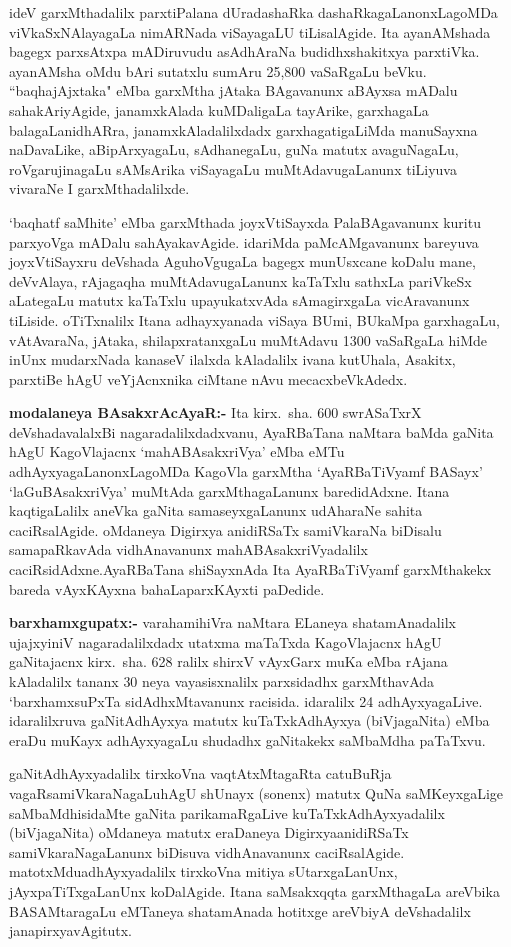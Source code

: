 ideV garxMthadalilx parxtiPalana dUradashaRka dashaRkagaLanonxLagoMDa viVkaSxNAlaya\-gaLa nimARNada viSayagaLU tiLisalAgide. Ita ayanAMshada bagegx parxsAtxpa mADiru\-vudu asAdhAraNa budidhxshakitxya parxtiVka. ayanAMsha oMdu bAri sutatxlu sumAru {\rm 25,800} vaSaRgaLu beVku. ``baqhajAjxtaka" eMba garxMtha jAtaka BAgavanunx aBAyxsa mADalu sahakAriyAgide, janamxkAlada kuMDaligaLa tayArike, garxhagaLa balagaLa\break nidhARra, janamxkAladalilxdadx garxhagatigaLiMda manuSayxna naDavaLike, aBipArxyagaLu, sAdhane\-gaLu, guNa matutx avaguNagaLu, roVgarujinagaLu sAMsArika viSayagaLu muMtAda\-vugaLanunx tiLiyuva vivaraNe I garxMthadalilxde.

`baqhatf saMhite' eMba garxMthada joyxVtiSayxda PalaBAgavanunx kuritu parxyoVga mADalu sahAyakavAgide. idariMda paMcAMgavanunx bareyuva joyxVtiSayxru deVshada AguhoVgugaLa bagegx munUsxcane koDalu mane, deVvAlaya, rAjagaqha muMtAdavugaLanunx kaTaTxlu sathxLa pariVkeSx aLategaLu matutx kaTaTxlu upayukatxvAda sAmagirxgaLa vicAravanunx tiLiside. oTiTxnalilx Itana adhayxyanada viSaya BUmi, BUkaMpa garxhagaLu, vAtAvaraNa, jAtaka, shilapxratanxgaLu muMtAdavu {\rm 1300} vaSaRgaLa hiMde inUnx mudarxNada kanaseV ilalxda kAladalilx ivana kutUhala, Asakitx, parxtiBe hAgU veYjAcnxnika ciMtane nAvu mecacxbeVkAdedx.

\textbf{modalaneya BAsakxrAcAyaR:-} Ita kirx.~sha. {\rm 600} swrASaTxrX deVshadavalalxBi nagara\-dalilxdadxvanu, AyaRBaTana naMtara baMda gaNita hAgU  KagoVlajacnx `mahABAsakxriVya' eMba eMTu adhAyxyagaLanonxLagoMDa KagoVla garxMtha `AyaRBaTiVyamf BASayx' `laGuBAsakxriVya' muMtAda garxMthagaLanunx baredidAdxne. Itana kaqtigaLalilx aneVka gaNita samaseyxgaLanunx udAharaNe sahita caciRsalAgide. oMdaneya Digirxya anidiRSaTx samiV\-karaNa biDisalu samapaRkavAda vidhAnavanunx mahABAsakxriVyadalilx caciRsidAdxne.\break AyaRBaTana shiSayxnAda Ita AyaRBaTiVyamf garxMthakekx bareda vAyxKAyxna bahaLa\break parxKAyxti paDedide. 

\textbf{barxhamxgupatx:-} varahamihiVra naMtara ELaneya shatamAnadalilx ujajxyiniV nagaradalilxdadx utatxma maTaTxda KagoVlajacnx hAgU gaNitajacnx kirx.~sha. {\rm 628} ralilx shirxV vAyxGarx muKa eMba rAjana kAladalilx tananx {\rm 30} neya vayasisxnalilx parxsidadhx garxMthavAda `barxhamxsuPxTa sidAdhxMtavanunx racisida. idaralilx {\rm 24} adhAyxyagaLive. idaralilxruva gaNitAdhAyxya matutx kuTaTxkAdhAyxya (biVjagaNita) eMba eraDu muKayx adhAyxyagaLu shudadhx gaNitakekx saMbaMdha paTaTxvu.

gaNitAdhAyxyadalilx tirxkoVna vaqtAtxMtagaRta catuBuRja vagaRsamiVkaraNagaLu\break hAgU shUnayx (sonenx) matutx QuNa saMKeyxgaLige saMbaMdhisidaMte gaNita parikamaRgaLive kuTaTxkAdhAyxyadalilx (biVjagaNita) oMdaneya matutx eraDaneya Digirxya\break anidiRSaTx samiVkaraNagaLanunx biDisuva vidhAnavanunx caciRsalAgide. matotxMdu\break adhAyxyadalilx tirxkoVna mitiya sUtarxgaLanUnx, jAyxpaTiTxgaLanUnx koDalAgide. Itana saMsakxqqta garxMthagaLa areVbika BASAMtaragaLu eMTaneya shatamAnada hotitxge areVbiyA deVshadalilx janapirxyavAgitutx.

